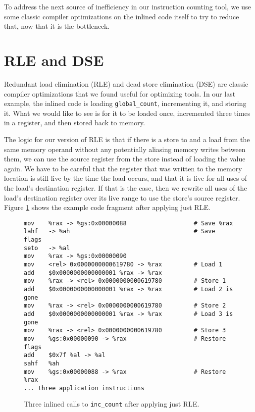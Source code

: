 To address the next source of inefficiency in our instruction counting tool, we
use some classic compiler optimizations on the inlined code itself to try to
reduce that, now that it is the bottleneck.

\section{RLE and DSE}

Redundant load elimination (RLE) and dead store elimination (DSE) are classic
compiler optimizations that we found useful for optimizing tools.  In our last
example, the inlined code is loading {\tt global\_count}, incrementing it, and
storing it.  What we would like to see is for it to be loaded once, incremented
three times in a register, and then stored back to memory.

The logic for our version of RLE is that if there is a store to and a load from
the same memory operand without any potentially aliasing memory writes between
them, we can use the source register from the store instead of loading the value
again.  We have to be careful that the register that was written to the memory
location is still live by the time the load occurs, and that it is live for all
uses of the load's destination register.  If that is the case, then we rewrite
all uses of the load's destination register over its live range to use the
store's source register.  Figure \ref{fig:inscount_rle} shows the example code
fragment after applying just RLE.

\begin{figure}
\begin{verbatim}
mov    %rax -> %gs:0x00000088                   # Save %rax
lahf   -> %ah                                   # Save flags
seto   -> %al 
mov    %rax -> %gs:0x00000090 
mov    <rel> 0x0000000000619780 -> %rax         # Load 1
add    $0x0000000000000001 %rax -> %rax 
mov    %rax -> <rel> 0x0000000000619780         # Store 1
add    $0x0000000000000001 %rax -> %rax         # Load 2 is gone
mov    %rax -> <rel> 0x0000000000619780         # Store 2
add    $0x0000000000000001 %rax -> %rax         # Load 3 is gone
mov    %rax -> <rel> 0x0000000000619780         # Store 3
mov    %gs:0x00000090 -> %rax                   # Restore flags
add    $0x7f %al -> %al 
sahf   %ah 
mov    %gs:0x00000088 -> %rax                   # Restore %rax
... three application instructions
\end{verbatim}
\caption{Three inlined calls to {\tt inc\_count} after applying just RLE.}
\label{fig:inscount_rle}
\end{figure}

